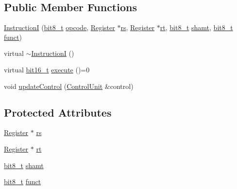 \subsection*{Public Member Functions}
\begin{DoxyCompactItemize}
\item 
\hyperlink{classMIPS_1_1InstructionI_a57bdbde86da12b395952eea141867ec2}{InstructionI} (\hyperlink{core_8hpp_a6074bae122ae7b527864eec42c728c3c}{bit8\+\_\+t} \hyperlink{classMIPS_1_1Instruction_a45cc6808b5dde8a5d41067d148b55476}{opcode}, \hyperlink{classMIPS_1_1Register}{Register} $\ast$\hyperlink{classMIPS_1_1InstructionI_a2be191d5b3dce505e2e626ec02eb4d62}{rs}, \hyperlink{classMIPS_1_1Register}{Register} $\ast$\hyperlink{classMIPS_1_1InstructionI_add1db07a5c954f35271de8c8a5737487}{rt}, \hyperlink{core_8hpp_a6074bae122ae7b527864eec42c728c3c}{bit8\+\_\+t} \hyperlink{classMIPS_1_1InstructionI_aa9b6da37c374c2ec8d96448d341e5e7d}{shamt}, \hyperlink{core_8hpp_a6074bae122ae7b527864eec42c728c3c}{bit8\+\_\+t} \hyperlink{classMIPS_1_1InstructionI_a5c6efcbbd233a7447c1fe24ea0a1e558}{funct})
\item 
virtual \hyperlink{classMIPS_1_1InstructionI_ae330e8a6a7d5820b0e559a7845867518}{$\sim$\+InstructionI} ()
\item 
virtual \hyperlink{core_8hpp_adc265a970bc35995b5879784bbb3f1b7}{bit16\+\_\+t} \hyperlink{classMIPS_1_1InstructionI_ae60fca5801bf5415cdff06d2aa11764f}{execute} ()=0
\item 
void \hyperlink{classMIPS_1_1InstructionI_a6aa4adb045591333e8f693bd4782cb0b}{update\+Control} (\hyperlink{classMIPS_1_1ControlUnit}{Control\+Unit} \&control)
\end{DoxyCompactItemize}
\subsection*{Protected Attributes}
\begin{DoxyCompactItemize}
\item 
\hyperlink{classMIPS_1_1Register}{Register} $\ast$ \hyperlink{classMIPS_1_1InstructionI_a2be191d5b3dce505e2e626ec02eb4d62}{rs}
\item 
\hyperlink{classMIPS_1_1Register}{Register} $\ast$ \hyperlink{classMIPS_1_1InstructionI_add1db07a5c954f35271de8c8a5737487}{rt}
\item 
\hyperlink{core_8hpp_a6074bae122ae7b527864eec42c728c3c}{bit8\+\_\+t} \hyperlink{classMIPS_1_1InstructionI_aa9b6da37c374c2ec8d96448d341e5e7d}{shamt}
\item 
\hyperlink{core_8hpp_a6074bae122ae7b527864eec42c728c3c}{bit8\+\_\+t} \hyperlink{classMIPS_1_1InstructionI_a5c6efcbbd233a7447c1fe24ea0a1e558}{funct}
\end{DoxyCompactItemize}


